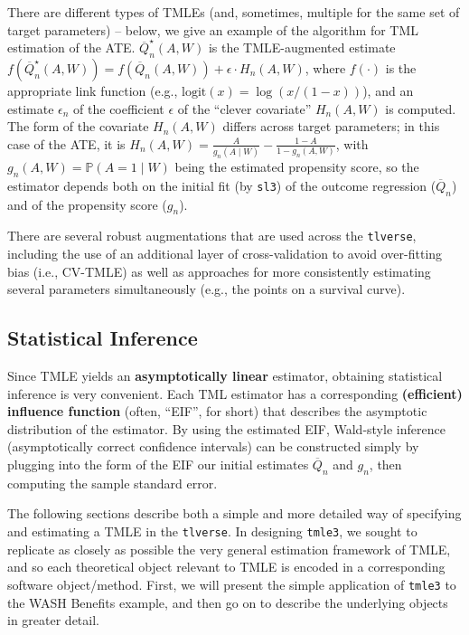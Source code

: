 \documentclass[
  12pt, krantz2,
]{krantz}
\newcommand{\passthrough}[1]{#1}
\newcommand{\1}{\mathbbm{1}}
\theoremstyle{definition}
\theoremstyle{definition}
\theoremstyle{definition}
\theoremstyle{definition}
\theoremstyle{remark}
\begin{document}
There are different types of TMLEs (and, sometimes, multiple for the same set of
target parameters) -- below, we give an example of the algorithm for TML
estimation of the ATE. \(\overline{Q}^{\star}_n(A,W)\) is the TMLE-augmented
estimate \(f(\overline{Q}^{\star}_n(A,W)) = f(\overline{Q}_n(A,W)) + \epsilon \cdot H_n(A,W)\), where \(f(\cdot)\) is the appropriate link function (e.g.,
\(\text{logit}(x) = \log(x / (1 - x))\)), and an estimate \(\epsilon_n\) of the
coefficient \(\epsilon\) of the ``clever covariate'' \(H_n(A,W)\) is computed. The
form of the covariate \(H_n(A,W)\) differs across target parameters; in this case
of the ATE, it is \(H_n(A,W) = \frac{A}{g_n(A \mid W)} - \frac{1-A}{1-g_n(A, W)}\), with \(g_n(A,W) = \mathbb{P}(A=1 \mid W)\) being the estimated propensity
score, so the estimator depends both on the initial fit (by \passthrough{\lstinline!sl3!}) of the
outcome regression (\(\overline{Q}_n\)) and of the propensity score (\(g_n\)).

There are several robust augmentations that are used across the \passthrough{\lstinline!tlverse!},
including the use of an additional layer of cross-validation to avoid
over-fitting bias (i.e., CV-TMLE) as well as approaches for more consistently
estimating several parameters simultaneously (e.g., the points on a survival
curve).

\hypertarget{tmle-infer}{%
\subsection{Statistical Inference}\label{tmle-infer}}

Since TMLE yields an \textbf{asymptotically linear} estimator, obtaining statistical
inference is very convenient. Each TML estimator has a corresponding
\textbf{(efficient) influence function} (often, ``EIF'', for short) that describes the
asymptotic distribution of the estimator. By using the estimated EIF, Wald-style
inference (asymptotically correct confidence intervals) can be constructed
simply by plugging into the form of the EIF our initial estimates
\(\overline{Q}_n\) and \(g_n\), then computing the sample standard error.

The following sections describe both a simple and more detailed way of
specifying and estimating a TMLE in the \passthrough{\lstinline!tlverse!}. In designing \passthrough{\lstinline!tmle3!}, we
sought to replicate as closely as possible the very general estimation framework
of TMLE, and so each theoretical object relevant to TMLE is encoded in a
corresponding software object/method. First, we will present the simple
application of \passthrough{\lstinline!tmle3!} to the WASH Benefits example, and then go on to describe
the underlying objects in greater detail.
\end{document}
